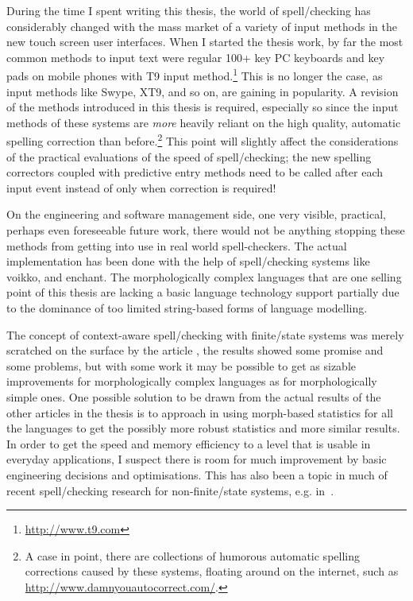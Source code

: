 \documentclass[officiallayout]{unihelcompling}
\begin{document}
During the time I spent writing this thesis, the world of spell\-/checking has
considerably changed with the mass market of a variety of input methods in the
new touch screen user interfaces. When I started the thesis work, by far the
most common methods to input text were regular 100+ key PC keyboards and key
pads on mobile phones with T9 input method.\footnote{\url{http://www.t9.com}}
This is no longer the case, as input methods like Swype, XT9, and so on, are
gaining in popularity. A revision of the methods introduced in this thesis is
required, especially so since the input methods of these systems are
\emph{more} heavily reliant on the high quality, automatic spelling correction
than before.\footnote{A case in point, there are collections of humorous
automatic spelling corrections caused by these systems, floating around on the
internet, such as \url{http://www.damnyouautocorrect.com/}.}  This point will
slightly affect the considerations of the practical evaluations of the speed of
spell\-/checking; the new spelling correctors coupled with predictive entry
methods need to be called after each input event instead of only when
correction is required!

On the engineering and software management side, one very visible, practical,
perhaps even foreseeable future work, there would not be anything stopping
these methods from getting into use in real world spell-checkers. The actual
implementation has been done with the help of spell\-/checking systems like
voikko, and enchant. The morphologically complex languages that are one selling
point of this thesis are lacking a basic language technology support partially
due to the dominance of too limited string-based forms of language modelling.

The concept of context-aware spell\-/checking with finite\-/state systems was
merely scratched on the surface by the article
, the results showed some promise and some
problems, but with some work it may be possible to get as sizable improvements
for morphologically complex languages as for morphologically simple ones. One
possible solution to be drawn from the actual results of the other articles in
the thesis is to approach in using morph-based statistics for all the languages
to get the possibly more robust statistics and more similar results. In order
to get the speed and memory efficiency to a level that is usable in everyday
applications, I suspect there is room for much improvement by basic engineering
decisions and optimisations. This has also been a topic in much of recent
spell\-/checking research for non-finite\-/state systems, e.g.
in~\citep{carlson2001scaling}.
\end{document}
